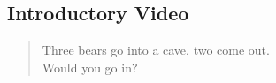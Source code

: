 
\subsection{Introductory Video}\label{video_intro}



\begin{quote}
{\ttfamily Three bears go into a cave, two come out.\\ 
Would you go in?}
\end{quote}


\newpage
